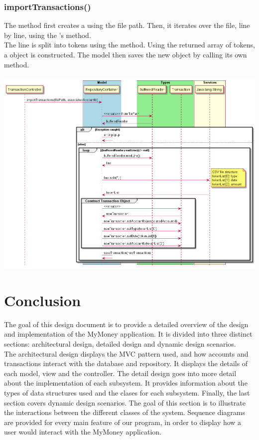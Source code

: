 \documentclass[12pt]{article}
\begin{document}
\newpage
\subsubsection{importTransactions()} \label{sec:modelImportDetail}
The  method first creates a  using the file path. Then, it iterates over the file, line by line, using the 's  method. \\

The line is split into tokens using the  method. Using the returned array of tokens, a  object is constructed. The model then saves the new object by calling its own  method.\\
\\
\includegraphics[width=\textwidth,height=\textheight,keepaspectratio]{diagrams/sequence/importLowLevel.png}
\bigskip
\newpage
\section{Conclusion}
The goal of this design document is to provide a detailed overview of the design and implementation of the MyMoney application. It is divided into three distinct sections: architectural design, detailed design and dynamic design scenarios. \\

The architectural design displays the MVC pattern used, and how accounts and transactions interact with the database and repository. It displays the details of each model, view and the controller. The detail design goes into more detail about the implementation of each subsystem. It provides information about the types of data structures used and the clases for each subsystem. Finally, the last section covers dynamic design scenarios. The goal of this section is to illustrate the interactions between the different classes of the system. Sequence diagrams are provided for every main feature of our program, in order to display how a user would interact with the MyMoney application.
\end{document}
